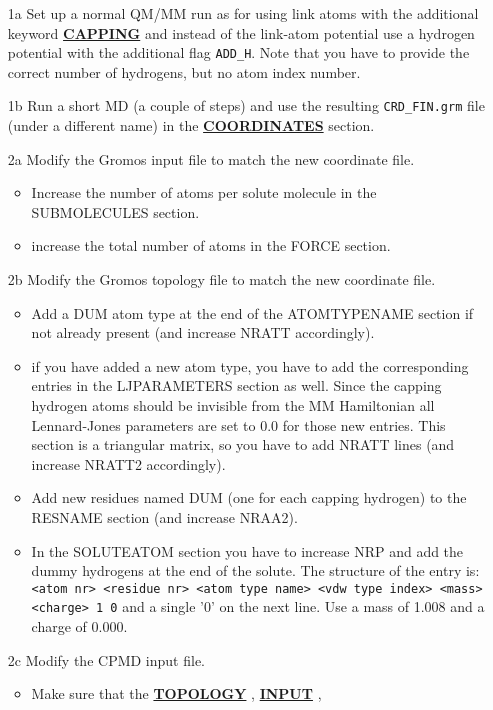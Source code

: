 \documentclass[twoside,10pt,titlepage,a4paper]{article}
\newcommand{\referto}[2]{\hyperlink{#1}{#2}}
\newcommand{\referto}[2]{\htmlref{#2}{#1}}
\newcommand{\refkeyword}[1]{%
\referto{#1}{\textbf{#1}}%
\index{#1}%
}%
\begin{document}
\begin{itemize}
\item[1a] Set up a normal QM/MM run as for using link atoms with the
  additional keyword \refkeyword{CAPPING} and instead of the link-atom
  potential use a hydrogen potential with the additional flag
  \texttt{ADD\_H}. Note that you have to provide the correct number of
  hydrogens, but no atom index number.
\item[1b] Run a short MD (a couple of steps) and use the resulting
  \texttt{CRD\_FIN.grm} file (under a different name) in the
  \refkeyword{COORDINATES} section.
\item[2a] Modify the Gromos input file to match the new coordinate file.
  \begin{itemize}
  \item Increase the number of atoms per solute molecule in the
    SUBMOLECULES section.
  \item increase the total number of atoms in the FORCE section.
  \end{itemize}
\item[2b] Modify the Gromos topology file to match the new coordinate
  file.
  \begin{itemize}
  \item Add a DUM atom type at the end of the ATOMTYPENAME section if
    not already present (and increase NRATT accordingly).
  \item if you have added a new atom type, you have to add the
    corresponding entries in the LJPARAMETERS section as well.
    Since the capping hydrogen atoms should be invisible from the MM
    Hamiltonian all Lennard-Jones parameters are set to 0.0 for those
    new entries. This section is a triangular matrix, so you have to
    add NRATT lines (and increase NRATT2 accordingly).
  \item Add new residues named DUM (one for each capping hydrogen) to
    the RESNAME section (and increase NRAA2).
  \item In the SOLUTEATOM section you have to increase NRP and add the
     dummy hydrogens at the end of the solute.
     The structure of the entry is:
     \verb|<atom nr> <residue nr> <atom type name> <vdw type index> <mass> <charge> 1 0|
     and a single '0' on the next line. Use a mass of 1.008 and a charge of 0.000.
  \end{itemize}
\item [2c] Modify the CPMD input file.
  \begin{itemize}
  \item Make sure that the \refkeyword{TOPOLOGY}, \refkeyword{INPUT},

\end{itemize}
\end{itemize}
\end{document}

